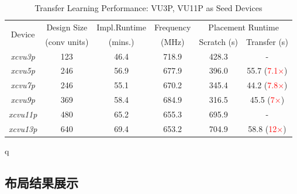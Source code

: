 \begin{table}[h!]
    \caption{Transfer Learning Performance: VU3P, VU11P as Seed Devices}
    \label{table:port}
    \centering
    \begin{adjustbox}{width=0.8\columnwidth,center}
    \begin{tabular}{c|c c c c c}
      \toprule
  \multirow{2}{*}{Device}     & Design Size 		& Impl.Runtime 		& Frequency 	 & \multicolumn{2}{c}{Placement Runtime}    			\\ \cline{5-6}
                                 & (conv units)		& (mins.)				& (MHz)			 & 	Scratch (s)			& 	Transfer (s)				\\
      \midrule
      \emph{xcvu3p}  			& 123				&	46.4			& 718.9			 & 428.3				& - 							\\
      \emph{xcvu5p}  			& 246				&   56.9				& 677.9	 		 & 396.0				& 55.7 	(\textcolor{red}{7.1$\times$})							\\
      \emph{xcvu7p}  			& 246			    &   55.1				& 670.2	 		 & 345.4				& 44.2 	(\textcolor{red}{7.8$\times$})							\\
      \emph{xcvu9p}  			& 369	   			&   58.4				& 684.9	 		 & 316.5				& 45.5 	(\textcolor{red}{7$\times$})							\\ 
      \midrule
      \emph{xcvu11p} 			& 480	      	    &	65.2          	& 655.3	 		 & 695.9				& -								\\	
      \emph{xcvu13p} 			& 640        	    & 	69.4   			& 653.2	 		 & 704.9				& 58.8	(\textcolor{red}{12$\times$})			\\
      \bottomrule
    \end{tabular}
    \vspace{-0.1in}
    \end{adjustbox}
  \end{table}q  


\subsection{布局结果展示}

